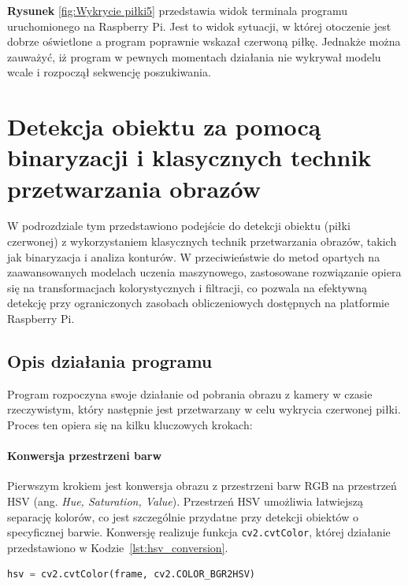\documentclass[a4paper,twoside,12pt]{book}
\begin{document}
\textbf{Rysunek} \ref{fig:Wykrycie piłki5} przedstawia widok terminala programu uruchomionego na Raspberry Pi. Jest to widok sytuacji, w której otoczenie jest dobrze oświetlone a program poprawnie wskazał czerwoną piłkę. Jednakże można zauważyć, iż program w pewnych momentach działania nie wykrywał modelu wcale i rozpoczął sekwencję poszukiwania. 

\newpage

\section{Detekcja obiektu za pomocą binaryzacji i klasycznych technik przetwarzania obrazów}

W podrozdziale tym przedstawiono podejście do detekcji obiektu (piłki czerwonej) z wykorzystaniem klasycznych technik przetwarzania obrazów, takich jak binaryzacja i analiza konturów. W przeciwieństwie do metod opartych na zaawansowanych modelach uczenia maszynowego, zastosowane rozwiązanie opiera się na transformacjach kolorystycznych i filtracji, co pozwala na efektywną detekcję przy ograniczonych zasobach obliczeniowych dostępnych na platformie Raspberry Pi.

\subsection{Opis działania programu}

Program rozpoczyna swoje działanie od pobrania obrazu z kamery w czasie rzeczywistym, który następnie jest przetwarzany w celu wykrycia czerwonej piłki. Proces ten opiera się na kilku kluczowych krokach:

\paragraph{Konwersja przestrzeni barw}
Pierwszym krokiem jest konwersja obrazu z przestrzeni barw RGB na przestrzeń HSV (ang. \textit{Hue, Saturation, Value}). Przestrzeń HSV umożliwia łatwiejszą separację kolorów, co jest szczególnie przydatne przy detekcji obiektów o specyficznej barwie. Konwersję realizuje funkcja \texttt{cv2.cvtColor}, której działanie przedstawiono w Kodzie~\ref{lst:hsv_conversion}.

\begin{lstlisting}[language=Python, caption={Konwersja obrazu z przestrzeni RGB do HSV.}, label={lst:hsv_conversion}, captionpos=b]
hsv = cv2.cvtColor(frame, cv2.COLOR_BGR2HSV)
\end{lstlisting}
\end{document}
